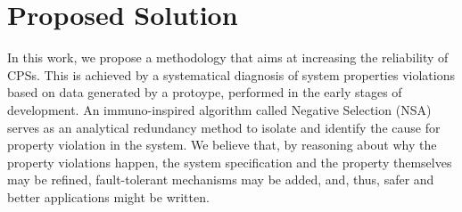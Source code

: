   




\vspace{0.5 cm}

\noindent{}
\vspace{0.3 cm}

\section{Proposed Solution}

In this work, we propose a methodology that aims at increasing the reliability of CPSs. This is achieved by a systematical diagnosis of system properties violations based on data generated by a protoype, performed in the early stages of development. An immuno-inspired algorithm called Negative Selection (NSA) serves as an analytical redundancy method to isolate and identify the cause for property violation in the system. We believe that, by reasoning about why the property violations happen, the system specification and the property themselves may be refined, fault-tolerant mechanisms may be added, and, thus, safer and better applications might be written.

